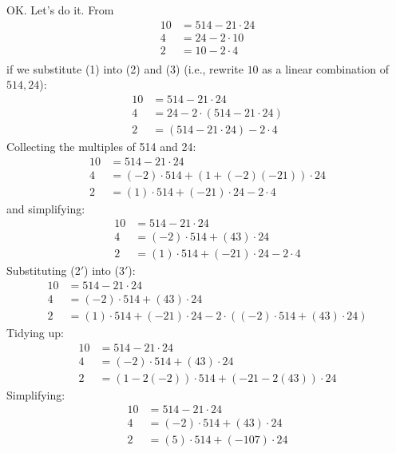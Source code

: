 OK. Let's do it.
From
\begin{align*}
10 &= 514 - 21 \cdot 24 \tag{1} \\
4  &= 24  - 2 \cdot 10  \tag{2} \\
2  &= 10  - 2 \cdot 4   \tag{3} \\
\end{align*}
if we substitute (1) into (2) and (3) (i.e., rewrite $10$ as a linear
combination of $514,24$):
\begin{align*}
10 &= 514 - 21 \cdot 24 \tag{1} \\
4  &= 24  - 2 \cdot (514 - 21 \cdot 24)  \tag{2} \\
2  &= (514 - 21 \cdot 24)  - 2 \cdot 4   \tag{3} 
\end{align*}
Collecting the multiples of 514 and 24:
\begin{align*}
10 &= 514 - 21 \cdot 24 \tag{1} \\
4  &= (-2) \cdot 514 + (1 + (-2)(-21)) \cdot 24  \tag{2'} \\
2  &= (1) \cdot 514 + (-21) \cdot 24  - 2 \cdot 4   \tag{3'} 
\end{align*}
and simplifying:
\begin{align*}
10 &= 514 - 21 \cdot 24 \tag{1} \\
4  &= (-2) \cdot 514 + (43) \cdot 24  \tag{2$'$} \\
2  &= (1) \cdot 514 + (-21) \cdot 24  - 2 \cdot 4   \tag{3$'$} 
\end{align*}
Substituting (2$'$) into (3$'$):
\begin{align*}
10 &= 514 - 21 \cdot 24 \tag{1} \\
4  &= (-2) \cdot 514 + (43) \cdot 24  \tag{2$'$} \\
2  &= (1) \cdot 514 + (-21) \cdot 24  - 2 \cdot ((-2) \cdot 514 + (43) \cdot 24)  \tag{3$'$} 
\end{align*}
Tidying up:
\begin{align*}
10 &= 514 - 21 \cdot 24 \tag{1} \\
4  &= (-2) \cdot 514 + (43) \cdot 24  \tag{2'} \\
2  &= (1 - 2(-2)) \cdot 514 + (-21 - 2(43)) \cdot 24 \tag{3''} 
\end{align*}
Simplifying:
\begin{align*}
10 &= 514 - 21 \cdot 24 \tag{1} \\
4  &= (-2) \cdot 514 + (43) \cdot 24  \tag{2'} \\
2  &= (5) \cdot 514 + (-107) \cdot 24 \tag{3''}
\end{align*}

